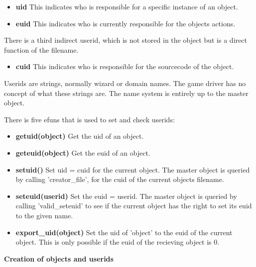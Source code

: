 \begin{itemize}
    \item{\bf uid} This indicates who is responsible for a specific instance
          of an object.

    \item{\bf euid} This indicates who is currently responsible for the
          objects actions.
\end{itemize}

There is a third indirect userid, which is not stored in the object but is
a direct function of the filename.

\begin{itemize}
    \item{\bf cuid} This indicates who is responsible for the sourcecode of
          the object.
\end{itemize}

Userids are strings, normally wizard or domain names. The game driver has
no concept of what these strings are. The name system is entirely up to
the master object. 

There is five efuns that is used to set and check userids:

\begin{itemize}
    \item{\bf getuid(object)} Get the uid of an object.

    \item{\bf geteuid(object)} Get the euid of an object.

    \item{\bf setuid()} Set uid = cuid for the current object.
                  The master object is queried by calling 
                  'creator\_file', for the cuid of the
                  current objects filename.
    
    \item{\bf seteuid(userid)} Set the euid = userid.
                  The master object is queried by calling
                  'valid\_seteuid' to see if the current
                  object has the right to set its euid
                  to the given name.

    \item{\bf export\_uid(object)} Set the uid of 'object' to the euid of
                  the current object. This is only possible
                  if the euid of the recieving object is 0.
\end{itemize}

{\bf Creation of objects and userids}

